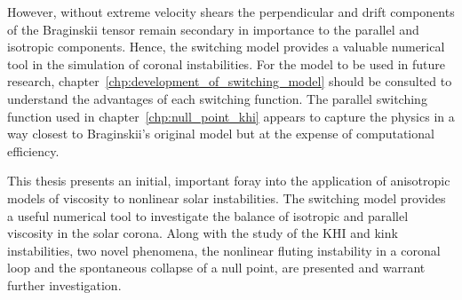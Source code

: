 However, without extreme velocity shears the perpendicular and drift components of the Braginskii tensor remain secondary in importance to the parallel and isotropic components. Hence, the switching model provides a valuable numerical tool in the simulation of coronal instabilities. For the model to be used in future research, chapter~\ref{chp:development_of_switching_model} should be consulted to understand the advantages of each switching function. The parallel switching function used in chapter~\ref{chp:null_point_khi} appears to capture the physics in a way closest to Braginskii's original model but at the expense of computational efficiency.

This thesis presents an initial, important foray into the application of anisotropic models of viscosity to nonlinear solar instabilities. The switching model provides a useful numerical tool to investigate the balance of isotropic and parallel viscosity in the solar corona. Along with the study of the KHI and kink instabilities, two novel phenomena, the nonlinear fluting instability in a coronal loop and the spontaneous collapse of a null point, are presented and warrant further investigation.
